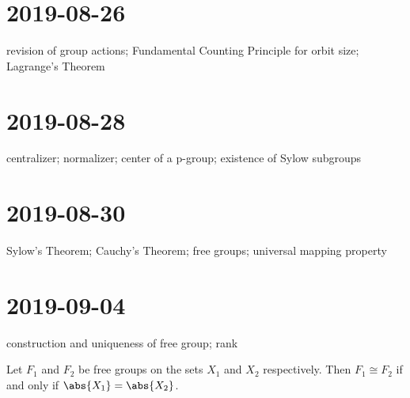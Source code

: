 \documentclass{ccg-notes}
\author{Colton Grainger}
\date{\today}
\begin{document}
\frontstuff

\section{2019-08-26}
revision of group actions;
Fundamental Counting Principle for orbit size;
Lagrange's Theorem

\section{2019-08-28}
centralizer;
normalizer;
center of a p-group;
existence of Sylow subgroups

\section{2019-08-30}
Sylow's Theorem;
Cauchy's Theorem;
free groups;
universal mapping property

\section{2019-09-04}
construction and uniqueness of free group;
rank

\begin{prop}
    \label{prop:free_forgetful_adjunction}
    Let $F_1$ and $F_2$ be free groups on the sets $X_1$ and $X_2$ respectively. Then $F_1 \cong F_2$ if and only if $\abs{X_1} = \abs{X_2}$.
\end{prop}
\end{document}
